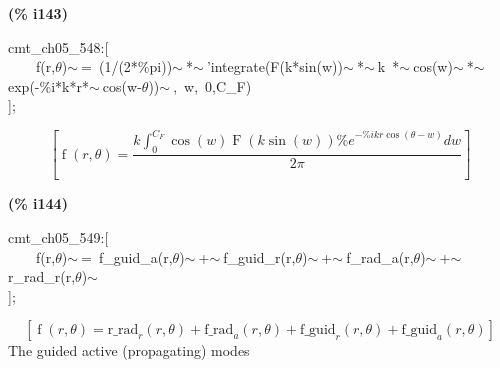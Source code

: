 \documentclass[fleqn]{article}
\begin{document}
\noindent
\begin{minipage}[t]{4.000000em}\color{red}\bfseries
(\% i143)	
\end{minipage}
\begin{minipage}[t]{\textwidth}\color{blue}
cmt\_ch05\_548:[\\
\ \ \ \ f(r,\ensuremath{\theta})\ensuremath{\sim\ }=\ (1/(2*\%pi))\ensuremath{\sim\ }*\ensuremath{\sim\ }'integrate(F(k*sin(w))\ensuremath{\sim\ }*\ensuremath{\sim\ }k\ *\ensuremath{\sim\ }cos(w)\ensuremath{\sim\ }*\ensuremath{\sim\ }exp(-\%i*k*r*\ensuremath{\sim\ }cos(w-\ensuremath{\theta}))\ensuremath{\sim\ },\ w,\ 0,C\_F)\\
];
\end{minipage}
\[\displaystyle \tag{\% o143} 
\left[ \operatorname{f}\left( r\operatorname{,}\theta \right) =\frac{k \int_{0}^{{C_F}}{\left. \cos{(w)} \operatorname{F}\left( k \sin{(w)}\right)  {{\% e}^{-\% i k r \cos{\left( \theta -w\right) }}}dw\right.}}{2 \ensuremath{\pi} }\right] \mbox{}
\]


\noindent
\begin{minipage}[t]{4.000000em}\color{red}\bfseries
(\% i144)	
\end{minipage}
\begin{minipage}[t]{\textwidth}\color{blue}
cmt\_ch05\_549:[\\
\ \ \ \ f(r,\ensuremath{\theta})\ensuremath{\sim\ }=\ f\_guid\_a(r,\ensuremath{\theta})\ensuremath{\sim\ }+\ensuremath{\sim\ }f\_guid\_r(r,\ensuremath{\theta})\ensuremath{\sim\ }+\ensuremath{\sim\ }f\_rad\_a(r,\ensuremath{\theta})\ensuremath{\sim\ }+\ensuremath{\sim\ }r\_rad\_r(r,\ensuremath{\theta})\ensuremath{\sim\ }\\
];
\end{minipage}
\[\displaystyle \tag{\% o144} 
\left[ \operatorname{f}\left( r\operatorname{,}\theta \right) ={{\ensuremath{\mathrm{r\_ rad}}}_r}\left( r\operatorname{,}\theta \right) +{{\ensuremath{\mathrm{f\_ rad}}}_a}\left( r\operatorname{,}\theta \right) +{{\ensuremath{\mathrm{f\_ guid}}}_r}\left( r\operatorname{,}\theta \right) +{{\ensuremath{\mathrm{f\_ guid}}}_a}\left( r\operatorname{,}\theta \right) \right] \mbox{}
\]
The guided active (propagating) modes
\end{document}
